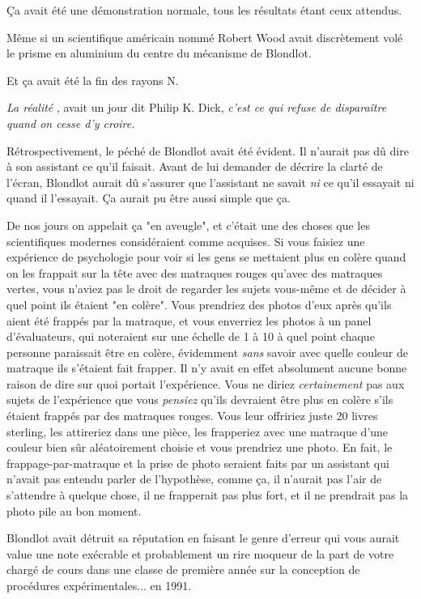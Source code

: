 Ça avait été une démonstration normale, tous les résultats étant ceux attendus.

Même si un scientifique américain nommé Robert Wood avait discrètement volé le prisme en aluminium du centre du mécanisme de Blondlot.

Et ça avait été la fin des rayons N.

\emph{La réalité} , avait un jour dit Philip K. Dick, \emph{c'est ce qui refuse de disparaître quand on cesse d'y croire.} 

Rétrospectivement, le péché de Blondlot avait été évident. Il n'aurait pas dû dire à son assistant ce qu'il faisait. Avant de lui demander de décrire la clarté de l'écran, Blondlot aurait dû s'assurer que l'assistant ne savait \emph{ni}  ce qu'il essayait ni quand il l'essayait. Ça aurait pu être aussi simple que ça.

De nos jours on appelait ça "en aveugle", et c'était une des choses que les scientifiques modernes considéraient comme acquises. Si vous faisiez une expérience de psychologie pour voir si les gens se mettaient plus en colère quand on les frappait sur la tête avec des matraques rouges qu'avec des matraques vertes, vous n'aviez pas le droit de regarder les sujets vous-même et de décider à quel point ils étaient "en colère". Vous prendriez des photos d'eux après qu'ils aient été frappés par la matraque, et vous enverriez les photos à un panel d'évaluateurs, qui noteraient sur une échelle de 1 à 10 à quel point chaque personne paraissait être en colère, évidemment \emph{sans}  savoir avec quelle couleur de matraque ils s'étaient fait frapper. Il n'y avait en effet absolument aucune bonne raison de dire sur quoi portait l'expérience. Vous ne diriez \emph{certainement}  pas aux sujets de l'expérience que vous \emph{pensiez}  qu'ils devraient être plus en colère s'ils étaient frappés par des matraques rouges. Vous leur offririez juste 20 livres sterling, les attireriez dans une pièce, les frapperiez avec une matraque d'une couleur bien sûr aléatoirement choisie et vous prendriez une photo. En fait, le frappage-par-matraque et la prise de photo seraient faits par un assistant qui n'avait pas entendu parler de l'hypothèse, comme ça, il n'aurait pas l'air de s'attendre à quelque chose, il ne frapperait pas plus fort, et il ne prendrait pas la photo pile au bon moment.

Blondlot avait détruit sa réputation en faisant le genre d'erreur qui vous aurait value une note exécrable et probablement un rire moqueur de la part de votre chargé de cours dans une classe de première année sur la conception de procédures expérimentales... en 1991.

